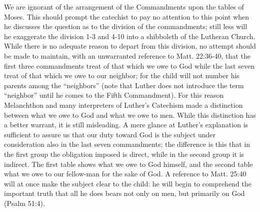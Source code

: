 We are ignorant of the arrangement of the Commandments upon the tables of Moses. This should prompt the catechist to pay no attention to this point when he discusses the question as to the division of the commandments; still less will he exaggerate the division 1-3 and 4-10 into a shibboleth of the Lutheran Church. While there is no adequate reason to depart from this division, no attempt should be made to maintain, with an unwarranted reference to Matt. 22:36-40, that the first three commandments treat of that which we owe to God while the last seven treat of that which we owe to our neighbor; for the child will not number his parents among the “neighbors” (note that Luther does not introduce the term “neighbor” until he comes to the Fifth Commandment). For this reason Melanchthon and many interpreters of Luther’s Catechism made a distinction between what we owe to God and what we owe to men. While this distinction has a better warrant, it is still misleading. A mere glance at Luther’s explanation is sufficient to assure us that our duty toward God is the subject under consideration also in the last seven commandments; the difference is this that in the first group the obligation imposed is direct, while in the second group it is indirect. The first table shows what we owe to God himself, and the second table what we owe to our fellow-man for the sake of God. A reference to Matt. 25:40 will at once make the subject clear to the child: he will begin to comprehend the important truth that all he does bears not only on men, but primarily on God (Psalm 51:4).

